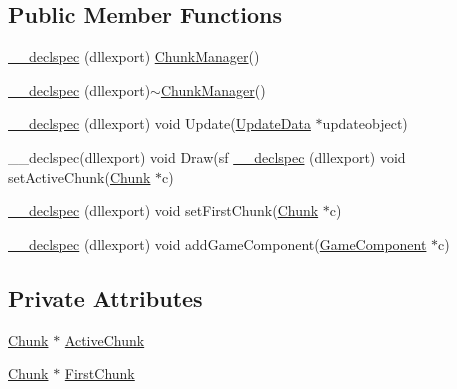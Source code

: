 \subsection*{Public Member Functions}
\begin{DoxyCompactItemize}
\item 
\hyperlink{class_chunk_manager_a5174dca056d736be1e45b71dfc0930ef}{\-\_\-\-\_\-declspec} (dllexport) \hyperlink{class_chunk_manager}{Chunk\-Manager}()
\item 
\hyperlink{class_chunk_manager_a3ea11ca30e6e72f84a1f1bcfe6110543}{\-\_\-\-\_\-declspec} (dllexport)$\sim$\hyperlink{class_chunk_manager}{Chunk\-Manager}()
\item 
\hyperlink{class_chunk_manager_aae72476c716a7fe9f0f5c68b9e6e0ee2}{\-\_\-\-\_\-declspec} (dllexport) void Update(\hyperlink{class_update_data}{Update\-Data} $\ast$updateobject)
\item 
\-\_\-\-\_\-declspec(dllexport) void Draw(sf \hyperlink{class_chunk_manager_a1e77e66b79c2f65848acf922eceebc08}{\-\_\-\-\_\-declspec} (dllexport) void set\-Active\-Chunk(\hyperlink{class_chunk}{Chunk} $\ast$c)
\item 
\hyperlink{class_chunk_manager_aefbc2b592e93d6651226f055eb701d47}{\-\_\-\-\_\-declspec} (dllexport) void set\-First\-Chunk(\hyperlink{class_chunk}{Chunk} $\ast$c)
\item 
\hyperlink{class_chunk_manager_a132a5714695e761d05b32321c721a1d8}{\-\_\-\-\_\-declspec} (dllexport) void add\-Game\-Component(\hyperlink{class_game_component}{Game\-Component} $\ast$c)
\end{DoxyCompactItemize}
\subsection*{Private Attributes}
\begin{DoxyCompactItemize}
\item 
\hyperlink{class_chunk}{Chunk} $\ast$ \hyperlink{class_chunk_manager_a8008f62926fe10f46ac59001aae2d372}{Active\-Chunk}
\item 
\hyperlink{class_chunk}{Chunk} $\ast$ \hyperlink{class_chunk_manager_afb87cd5dd3cb61f09a6038d1796719ba}{First\-Chunk}
\end{DoxyCompactItemize}


